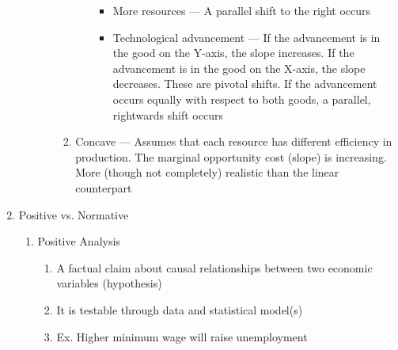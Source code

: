\documentclass[12pt]{article}
\begin{document}
\begin{enumerate}
\begin{enumerate}
\begin{enumerate}
\begin{enumerate}
\begin{itemize}
                        \begin{itemize}

                          \item More resources — A parallel shift to the right occurs

                          \item Technological advancement — If the advancement is in the good on the Y-axis, the slope increases. If the advancement is in the good on the X-axis, the slope decreases. These are pivotal shifts. If the advancement occurs equally with respect to both goods, a parallel, rightwards shift occurs
                            
                        \end{itemize}

                    \end{itemize}

                  \item Concave — Assumes that each resource has different efficiency in production. The marginal opportunity cost (slope) is increasing. More (though not completely) realistic than the linear counterpart

                \end{enumerate}

            \end{enumerate}

        \end{enumerate}

      \item Positive vs. Normative

        \begin{enumerate}

          \item Positive Analysis

            \begin{enumerate}

              \item A factual claim about causal relationships between two economic variables (hypothesis)

              \item It is testable through data and statistical model(s)

              \item Ex. Higher minimum wage will raise unemployment

            \end{enumerate}


\end{enumerate}
\end{enumerate}
\end{document}
